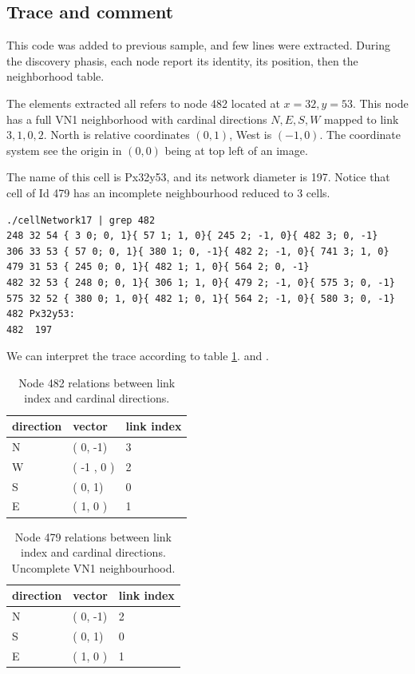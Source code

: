 \subsection {Trace and comment }

This code was added to previous sample, and few lines were extracted.
During the discovery phasis, each node report its identity, its position, then 
the neighborhood table.

The elements extracted all refers to node 482  located at $x= 32, y=53$.
This node has a full VN1 neighborhood with cardinal directions $ N, E, S,  W$
mapped to link $ 3 , 1, 0, 2$. North is relative coordinates $(0,1)$, West is $(-1, 0)$.
The coordinate system see the origin in $(0,0)$ being at top left of an image.

The name of this cell is Px32y53, and its network diameter is 197.
Notice that cell of Id 479 has an incomplete neighbourhood reduced to 3 cells.

\begin{lstlisting}
./cellNetwork17 | grep 482
248 32 54 { 3 0; 0, 1}{ 57 1; 1, 0}{ 245 2; -1, 0}{ 482 3; 0, -1}
306 33 53 { 57 0; 0, 1}{ 380 1; 0, -1}{ 482 2; -1, 0}{ 741 3; 1, 0}
479 31 53 { 245 0; 0, 1}{ 482 1; 1, 0}{ 564 2; 0, -1}
482 32 53 { 248 0; 0, 1}{ 306 1; 1, 0}{ 479 2; -1, 0}{ 575 3; 0, -1}
575 32 52 { 380 0; 1, 0}{ 482 1; 0, 1}{ 564 2; -1, 0}{ 580 3; 0, -1}
482 Px32y53:
482  197
\end{lstlisting}

We can interpret the trace according to table \ref{tab:cardialAndIndex}. and \label{tab:cardialAndIndex479}.
\begin{table}[htb]
\begin{center}
\begin{tabular}{|l|l|l|}\hline
direction & vector & link index \\\hline
N  &  ( 0, -1) &   3 \\\hline
W  &   ( -1 ,  0 ) &   2  \\\hline
S  &  ( 0, 1) & 0   \\\hline
E  &  ( 1, 0 ) &   1 \\\hline
\end{tabular}
\caption{Node 482 relations between link index and cardinal directions. }
\label{tab:cardialAndIndex}
\end{center}
\end{table}


\begin{table}[htb]
\begin{center}
\begin{tabular}{|l|l|l|}\hline
direction & vector & link index \\\hline
N  &  ( 0, -1) &   2 \\\hline 
S  &  ( 0, 1) & 0   \\\hline
E  &  ( 1, 0 ) &   1 \\\hline
\end{tabular}
\caption{Node 479 relations between link index and cardinal directions. Uncomplete VN1 neighbourhood. }
\label{tab:cardialAndIndex479}
\end{center}
\end{table}




